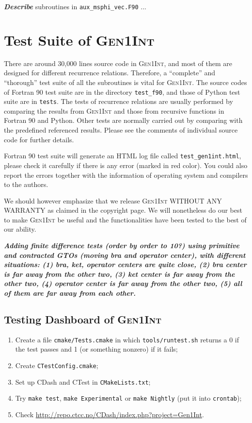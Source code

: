 \documentclass[a4paper,11pt,twoside,openright]{book}
\newcommand{\fixme}[1]{\textbf{\textit{\color{red} #1}}}
\begin{document}
\fixme{Describe} subroutines in \verb|aux_msphi_vec.F90| ...

\section{Test Suite of \textsc{Gen1Int}}
\label{sect:test-suite}

There are around 30,000 lines source code in \textsc{Gen1Int}, and most of them are designed for
different recurrence relations. Therefore, a ``complete'' and ``thorough'' test suite of all the subroutines
is vital for \textsc{Gen1Int}. The source codes of Fortran 90 test suite are in the directory \verb|test_f90|,
and those of Python test suite are in \verb|tests|. The tests of recurrence relations are usually performed
by comparing the results from \textsc{Gen1Int} and those from recursive functions in Fortran 90 and Python.
Other tests are normally carried out by comparing with the predefined referenced results. Please see the
comments of individual source code for further details.

Fortran 90 test suite will generate an HTML log file called \verb|test_gen1int.html|, please check it carefully
if there is any error (marked in red color). You could also report the errors together with the information of
operating system and compilers to the authors.

We should however emphasize that we release \textsc{Gen1Int} WITHOUT ANY WARRANTY as claimed
in the copyright page. We will nonetheless do our best to make \textsc{Gen1Int} be useful and the functionalities
have been tested to the best of our ability.

\fixme{Adding finite difference tests (order by order to 10?) using primitive and contracted GTOs (moving bra and operator center),
with different situations: (1) bra, ket, operator centers are quite close, (2) bra center is far away from the other
two, (3) ket center is far away from the other two, (4) operator center is far away from the other two,
(5) all of them are far away from each other.}

\subsection{Testing Dashboard of \textsc{Gen1Int}}
\label{sect:CDash}

\begin{enumerate}
  \item Create a file \verb|cmake/Tests.cmake| in which \verb|tools/runtest.sh| returns a 0 if the test passes
    and 1 (or something nonzero) if it fails;
  \item Create \verb|CTestConfig.cmake|;
  \item Set up CDash and CTest in \verb|CMakeLists.txt|;
  \item Try \verb|make test|, \verb|make Experimental| or \verb|make Nightly| (put it into \verb|crontab|);
  \item Check \url{http://repo.ctcc.no/CDash/index.php?project=Gen1Int}.
\end{enumerate}
\end{document}
